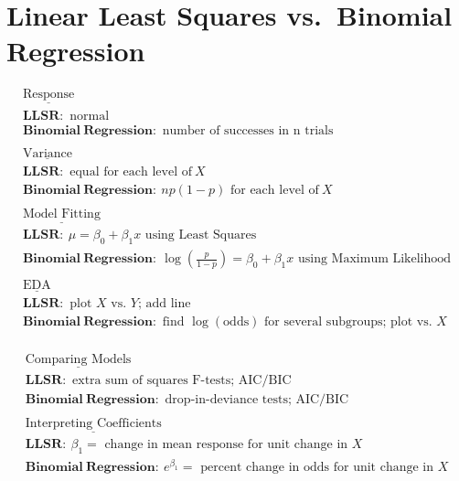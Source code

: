 \documentclass[
]{krantz}
\begin{document}
\hypertarget{linear-least-squares-vs.-binomial-regression}{%
\section{\texorpdfstring{Linear Least Squares  vs.~Binomial Regression }{Linear Least Squares  vs.~Binomial Regression }}\label{linear-least-squares-vs.-binomial-regression}}

\begin{gather*}
\underline{\textrm{Response}} \\
\mathbf{LLSR:}\textrm{ normal} \\
\mathbf{Binomial\ Regression:}\textrm{ number of successes in n trials} \\
\textrm{ } \\
\underline{\textrm{Variance}} \\
\mathbf{LLSR:}\textrm{ equal for each level of}\ X \\
\mathbf{Binomial\ Regression:}\ np(1-p)\textrm{ for each level of}\ X \\
\textrm{ } \\
\underline{\textrm{Model Fitting}} \\
\mathbf{LLSR:}\ \mu=\beta_0+\beta_1x \textrm{ using Least Squares}\\
\mathbf{Binomial\ Regression:}\ \log\left(\frac{p}{1-p}\right)=\beta_0+\beta_1x \textrm{ using Maximum Likelihood}\\
\textrm{ } \\
\underline{\textrm{EDA}} \\
\mathbf{LLSR:}\textrm{ plot $X$ vs. $Y$; add line} \\
\mathbf{Binomial\ Regression:}\textrm{ find $\log(\textrm{odds})$ for several subgroups; plot vs. $X$} \\
\end{gather*}

\begin{gather*}
\underline{\textrm{Comparing Models}} \\
\mathbf{LLSR:}\textrm{ extra sum of squares F-tests; AIC/BIC} \\
\mathbf{Binomial\ Regression:}\textrm{ drop-in-deviance tests; AIC/BIC} \\
\textrm{ } \\
\underline{\textrm{Interpreting Coefficients}} \\
\mathbf{LLSR:}\ \beta_1=\textrm{ change in mean response for unit change in $X$} \\
\mathbf{Binomial\ Regression:}\ e^{\beta_1}=\textrm{ percent change in odds for unit change in $X$} 
\end{gather*}
\end{document}

